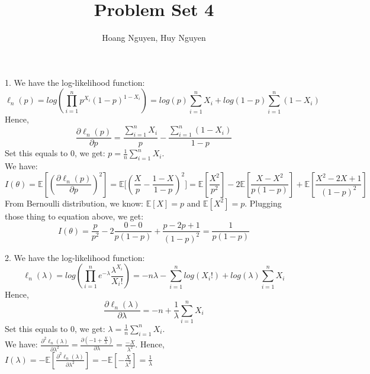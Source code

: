 \documentclass[10pt]{article}
\newenvironment{problem}[2][Problem]{\begin{trivlist}
\item[\hskip \labelsep {\bfseries #1}\hskip \labelsep {\bfseries #2.}]}{\end{trivlist}}
\begin{document}
\title{Problem Set 4}
\author{Hoang Nguyen, Huy Nguyen}
\maketitle
    
\begin{problem}{1}
\item 1.
We have the log-likelihood function:  
\[\ell_n(p) = log(\prod_{i=1}^{n}p^{X_i}(1-p)^{1-X_i})=log(p)\sum_{i=1}^{n}X_i + log(1-p)\sum_{i=1}^{n}(1-X_i) \]
Hence,
\[\frac{\partial\ell_n(p)}{\partial p}=\frac{\sum_{i=1}^{n}X_i}{p} - \frac{\sum_{i=1}^{n}(1 - X_i)}{1-p} \]
Set this equals to 0, we get: $p=\frac{1}{n}\sum_{i=1}^{n}X_i$.\\
We have:
\[I(\theta) =\mathbb{E}[(\frac{\partial\ell_n(p)}{\partial p})^2]=\mathbb{E}\Big[(\frac{X}{p} - \frac{1-X}{1-p})^2 \Big] = \mathbb{E}[\frac{X^2}{p^2}] - 2\mathbb{E}[\frac{X - X^2}{p(1-p)}] + \mathbb{E}[\frac{X^2-2X+1}{(1-p)^2}] \]
From Bernoulli distribution, we know: $\mathbb{E}[X]=p$ and $\mathbb{E}[X^2]=p$. Plugging those thing to equation above, we get:
\[ I(\theta)=\frac{p}{p^2} - 2\frac{0-0}{p(1-p)} + \frac{p-2p+1}{(1-p)^2}=\frac{1}{p(1-p)} \]

\item 2. 
We have the log-likelihood function:  
\[\ell_n(\lambda) = log(\prod_{i=1}^{n}e^{-\lambda} \frac{\lambda^{X_i}}{X_i!})=-n\lambda -\sum_{i=1}^{n}log(X_i!) + log(\lambda)\sum_{i=1}^{n}X_i \]
Hence,
\[\frac{\partial\ell_n(\lambda)}{\partial \lambda}= -n + \frac{1}{\lambda}\sum_{i=1}^{n}X_i \]
Set this equals to 0, we get: $\lambda=\frac{1}{n}\sum_{i=1}^{n}X_i$.\\
We have: $\frac{\partial^2\ell_n(\lambda)}{\partial \lambda^2}= \frac{\partial (-1 + \frac{X}{\lambda})}{\partial \lambda}=\frac{-X}{\lambda^2}$. Hence, $I(\lambda)= -\mathbb{E}[\frac{\partial^2\ell_n(\lambda)}{\partial \lambda^2}]= -\mathbb{E}[-\frac{X}{\lambda^2}]=\frac{1}{\lambda}$\\




\end{problem}
\end{document}

